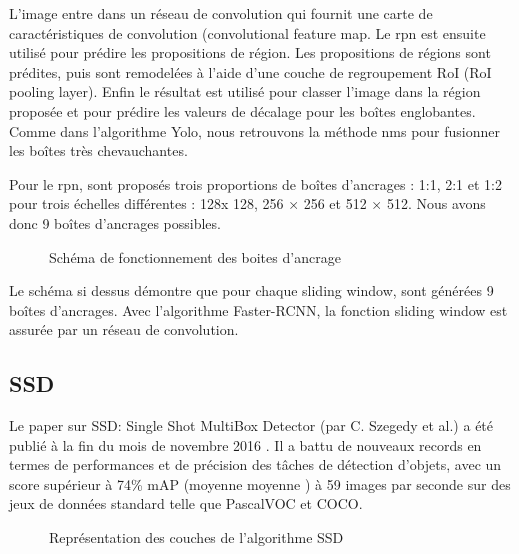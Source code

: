 \documentclass[debug,nodate,hideweeklyreports,noposter]{polytech/polytech}
\begin{document}
L’image entre dans un réseau de convolution qui fournit une carte de caractéristiques de convolution (convolutional feature map. Le \gls{rpn} est ensuite utilisé pour prédire les propositions de région. Les propositions de régions sont prédites, puis sont remodelées à l'aide d'une couche de regroupement RoI (RoI pooling layer). Enfin le résultat est utilisé pour classer l'image dans la région proposée et pour prédire les valeurs de décalage pour les boîtes englobantes. Comme dans l’algorithme Yolo, nous retrouvons la méthode \gls{nms} pour fusionner les boîtes très chevauchantes.

Pour le \gls{rpn}, sont proposés trois proportions de boîtes d’ancrages : 1:1, 2:1 et 1:2 pour trois échelles différentes : 128x 128, 256 × 256 et 512 × 512. Nous avons donc 9 boîtes d’ancrages possibles.

\begin{figure}
  \caption{Schéma de fonctionnement des boites d'ancrage}
  \label{fig:fasterrcnnanchor}
\end{figure}

Le schéma si dessus démontre que pour chaque sliding window, sont générées 9 boîtes d’ancrages. Avec l’algorithme Faster-RCNN, la fonction sliding window est assurée par un réseau de convolution.

\subsection{SSD}

Le paper sur SSD: Single Shot MultiBox Detector (par C. Szegedy et al.) a été publié à la fin du mois de novembre 2016 \cite{DBLP:journals/corr/LiuAESR15}. Il a battu de nouveaux records en termes de performances et de précision des tâches de détection d’objets, avec un score supérieur à 74\% mAP (moyenne moyenne ) à 59 images par seconde sur des jeux de données standard telle que PascalVOC et COCO.

\begin{figure}
  \caption{Représentation des couches de l'algorithme SSD}
  \label{fig:ssdlayers}
\end{figure}
\end{document}
